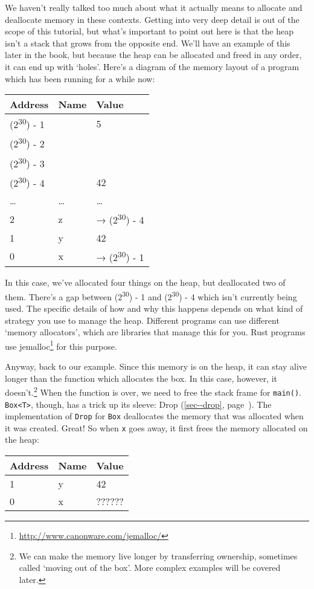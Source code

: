 \documentclass[a4paper,]{book}
\renewcommand*{\hyperlink}[2]{%
 #2 (\autoref{#1}, page~\pageref{#1})}
\renewcommand{\href}[2]{#2\footnote{\url{#1}}}
\begin{document}
We haven't really talked too much about what it actually means to
allocate and deallocate memory in these contexts. Getting into very deep
detail is out of the scope of this tutorial, but what's important to
point out here is that the heap isn't a stack that grows from the
opposite end. We'll have an example of this later in the book, but
because the heap can be allocated and freed in any order, it can end up
with `holes'. Here's a diagram of the memory layout of a program which
has been running for a while now:

\begin{longtable}[]{@{}lll@{}}
\toprule
Address & Name & Value\tabularnewline
\midrule
\endhead
(2\textsuperscript{30}) - 1 & & 5\tabularnewline
(2\textsuperscript{30}) - 2 & &\tabularnewline
(2\textsuperscript{30}) - 3 & &\tabularnewline
(2\textsuperscript{30}) - 4 & & 42\tabularnewline
\ldots{} & \ldots{} & \ldots{}\tabularnewline
2 & z & → (2\textsuperscript{30}) - 4\tabularnewline
1 & y & 42\tabularnewline
0 & x & → (2\textsuperscript{30}) - 1\tabularnewline
\bottomrule
\end{longtable}

In this case, we've allocated four things on the heap, but deallocated
two of them. There's a gap between (2\textsuperscript{30}) - 1 and
(2\textsuperscript{30}) - 4 which isn't currently being used. The
specific details of how and why this happens depends on what kind of
strategy you use to manage the heap. Different programs can use
different `memory allocators', which are libraries that manage this for
you. Rust programs use
\href{http://www.canonware.com/jemalloc/}{jemalloc} for this purpose.

Anyway, back to our example. Since this memory is on the heap, it can
stay alive longer than the function which allocates the box. In this
case, however, it doesn't.\footnote{We can make the memory live longer
  by transferring ownership, sometimes called `moving out of the box'.
  More complex examples will be covered later.} When the function is
over, we need to free the stack frame for \texttt{main()}.
\texttt{Box\textless{}T\textgreater{}}, though, has a trick up its
sleeve: \protect\hyperlink{sec--drop}{Drop}. The implementation of
\texttt{Drop} for \texttt{Box} deallocates the memory that was allocated
when it was created. Great! So when \texttt{x} goes away, it first frees
the memory allocated on the heap:

\begin{longtable}[]{@{}lll@{}}
\toprule
Address & Name & Value\tabularnewline
\midrule
\endhead
1 & y & 42\tabularnewline
0 & x & ??????\tabularnewline
\bottomrule
\end{longtable}
\end{document}
